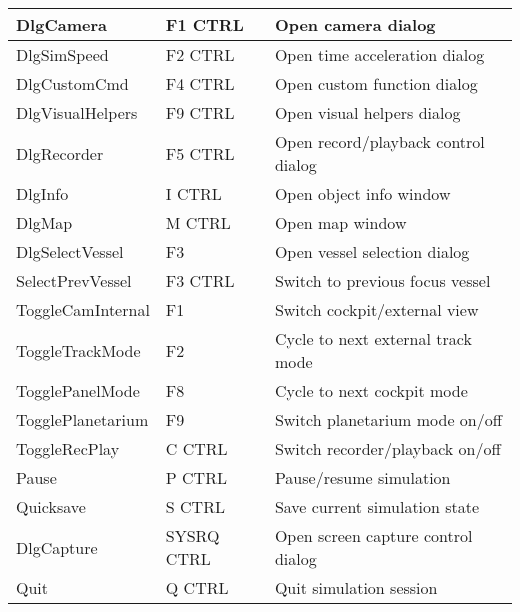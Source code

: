 \documentclass[Orbiter Developer Manual.tex]{subfiles}
\begin{document}
\begin{longtable}{ |p{}|p{}|p{}| }
	DlgCamera & F1 CTRL & Open camera dialog\\
	\hline\rule{0pt}{2ex}
	DlgSimSpeed & F2 CTRL & Open time acceleration dialog\\
	\hline\rule{0pt}{2ex}
	DlgCustomCmd & F4 CTRL & Open custom function dialog\\
	\hline\rule{0pt}{2ex}
	DlgVisualHelpers & F9 CTRL & Open visual helpers dialog\\
	\hline\rule{0pt}{2ex}
	DlgRecorder & F5 CTRL & Open record/playback control dialog\\
	\hline\rule{0pt}{2ex}
	DlgInfo & I CTRL & Open object info window\\
	\hline\rule{0pt}{2ex}
	DlgMap & M CTRL & Open map window\\
	\hline\rule{0pt}{2ex}
	DlgSelectVessel & F3 & Open vessel selection dialog\\
	\hline\rule{0pt}{2ex}
	SelectPrevVessel & F3 CTRL & Switch to previous focus vessel\\
	\hline\rule{0pt}{2ex}
	ToggleCamInternal & F1 & Switch cockpit/external view\\
	\hline\rule{0pt}{2ex}
	ToggleTrackMode & F2 & Cycle to next external track mode\\
	\hline\rule{0pt}{2ex}
	TogglePanelMode & F8 & Cycle to next cockpit mode\\
	\hline\rule{0pt}{2ex}
	TogglePlanetarium & F9 & Switch planetarium mode on/off\\
	\hline\rule{0pt}{2ex}
	ToggleRecPlay & C CTRL & Switch recorder/playback on/off\\
	\hline\rule{0pt}{2ex}
	Pause & P CTRL & Pause/resume simulation\\
	\hline\rule{0pt}{2ex}
	Quicksave & S CTRL & Save current simulation state\\
	\hline\rule{0pt}{2ex}
	DlgCapture & SYSRQ CTRL & Open screen capture control dialog\\
	\hline\rule{0pt}{2ex}
	Quit & Q CTRL & Quit simulation session\\
	\hline
	\end{longtable}
\end{document}
